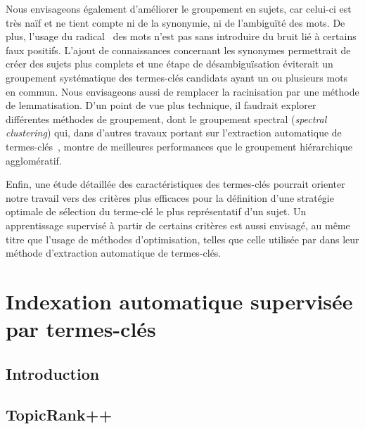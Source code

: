       Nous envisageons également d'améliorer le groupement en sujets, car
      celui-ci est très naïf et ne tient compte ni de la synonymie, ni de
      l'ambiguïté des mots. De plus, l'usage du
      radical~\cite{porter1980suffixstripping} des mots n'est pas sans
      introduire du bruit lié à certains faux positifs. L'ajout de connaissances
      concernant les synonymes permettrait de créer des sujets plus complets et
      une étape de désambiguïsation éviterait un groupement systématique des
      termes-clés candidats ayant un ou plusieurs mots en commun. Nous
      envisageons aussi de remplacer la racinisation par une méthode de
      lemmatisation. D'un point de vue plus technique, il faudrait explorer
      différentes méthodes de groupement, dont le groupement spectral
      (\textit{spectral clustering}) qui, dans d'autres travaux portant sur
      l'extraction automatique de termes-clés~\cite{liu2009keycluster}, montre
      de meilleures performances que le groupement hiérarchique agglomératif.

      Enfin, une étude détaillée des caractéristiques des termes-clés pourrait
      orienter notre travail vers des critères plus efficaces pour la définition
      d'une stratégie \og{}optimale\fg{} de sélection du terme-clé le plus
      représentatif d'un sujet. Un apprentissage supervisé à partir de certains
      critères est aussi envisagé, au même titre que l'usage de méthodes
      d'optimisation, telles que celle utilisée par
       dans leur méthode d'extraction
      automatique de termes-clés.    


  \chapter{Indexation automatique supervisée par termes-clés}
  \label{chap:main-automatic_keyphrase_annotation-supervised_automatic_keyphrase_extraction}
    \section{Introduction}
    \label{sec:main-automatic_keyphrase_annotation-supervised_automatic_keyphrase_annotation-introduction}

    \section{TopicRank++}
    \label{sec:main-automatic_keyphrase_annotation-supervised_automatic_keyphrase_annotation-topicrank++}
